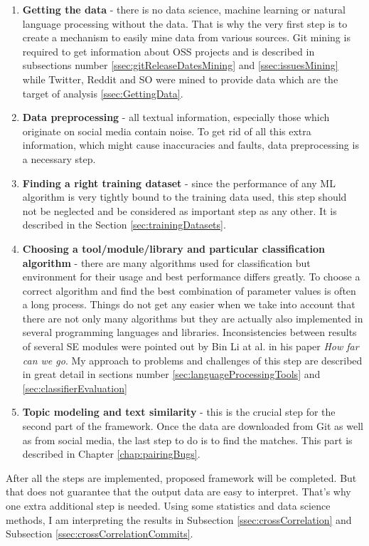 \begin{enumerate}
\item{\textbf{Getting the data} - there is no data science, machine learning or natural language processing without the data. That is why the very first step is to create a mechanism to easily mine data from various sources. Git mining is required to get information about OSS projects and is described in subsections number \ref{ssec:gitReleaseDatesMining} and \ref{ssec:issuesMining} while Twitter, Reddit and SO were mined to provide data which are the target of analysis \ref{ssec:GettingData}.}
\item{\textbf{Data preprocessing} - all textual information, especially those which originate on social media contain noise. To get rid of all this extra information, which might cause inaccuracies and faults, data preprocessing is a necessary step.}
\item{\textbf{Finding a right training dataset} - since the performance of any ML algorithm is very tightly bound to the training data used, this step should not be neglected and be considered as important step as any other. It is described in the Section \ref{sec:trainingDatasets}.}
\item{\textbf{Choosing a tool/module/library and particular classification algorithm} - there are many algorithms used for classification but environment for their usage and best performance differs greatly. To choose a correct algorithm and find the best combination of parameter values is often a long process. Things do not get any easier when we take into account that there are not only many algorithms but they are actually also implemented in several programming languages and libraries. Inconsistencies between results of several SE modules were pointed out by Bin Li at al. in his paper \textit{How far can we go}. My approach to problems and challenges of this step are described in great detail in sections number \ref{sec:languageProcessingTools} and \ref{sec:classifierEvaluation}}
\item{\textbf{Topic modeling and text similarity} - this is the crucial step for the second part of the framework. Once the data are downloaded from Git as well as from social media, the last step to do is to find the matches.   This part is described in Chapter \ref{chap:pairingBugs}.}
\end{enumerate}
After all the steps are implemented, proposed framework will be completed. But that does not guarantee that the output data are easy to interpret. That's why one extra additional step is needed. Using some statistics and data science methods, I am interpreting the results in Subsection \ref{ssec:crossCorrelation} and Subsection \ref{ssec:crossCorrelationCommits}.


